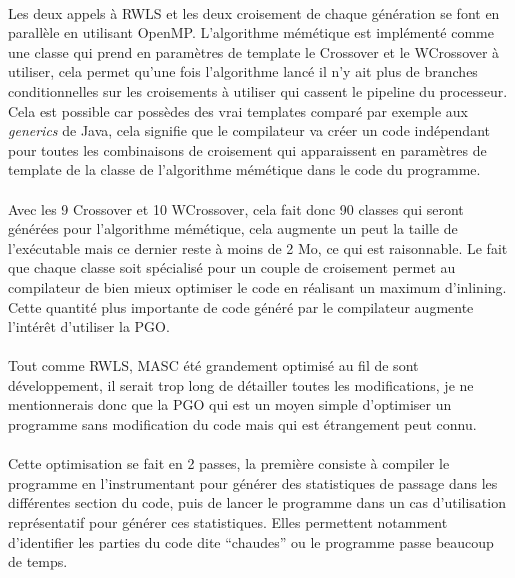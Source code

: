 \documentclass[a4paper,11pt,twoside,french,report]{../common/simplem}
\begin{document}
				\paragraph*{}
					Les deux appels à \gls{RWLS} et les deux croisement de chaque génération se font en parallèle en utilisant \gls{OpenMP}. L'algorithme mémétique est implémenté comme une classe qui prend en paramètres de template le Crossover et le WCrossover à utiliser, cela permet qu'une fois l'algorithme lancé il n'y ait plus de branches conditionnelles sur les croisements à utiliser qui cassent le pipeline du processeur. Cela est possible car \Cpp{} possèdes des vrai templates comparé par exemple aux \textit{generics} de Java, cela signifie que le compilateur va créer un code indépendant pour toutes les combinaisons de croisement qui apparaissent en paramètres de template de la classe de l'algorithme mémétique dans le code du programme.
				\paragraph*{}
					Avec les 9 Crossover et 10 WCrossover, cela fait donc 90 classes qui seront générées pour l'algorithme mémétique, cela augmente un peut la taille de l'exécutable mais ce dernier reste à moins de 2 Mo, ce qui est raisonnable. Le fait que chaque classe soit spécialisé pour un couple de croisement permet au compilateur de bien mieux optimiser le code en réalisant un maximum d'inlining. Cette quantité plus importante de code généré par le compilateur augmente l'intérêt d'utiliser la \gls{PGO}.
				\paragraph*{}
					Tout comme \gls{RWLS}, \gls{MASC} été grandement optimisé au fil de sont développement, il serait trop long de détailler toutes les modifications, je ne mentionnerais donc que la \gls{PGO} qui est un moyen simple d'optimiser un programme sans modification du code mais qui est étrangement peut connu.
				\paragraph*{}
					Cette optimisation se fait en 2 passes, la première consiste à compiler le programme en l'instrumentant pour générer des statistiques de passage dans les différentes section du code, puis de lancer le programme dans un cas d'utilisation représentatif pour générer ces statistiques. Elles permettent notamment d'identifier les parties du code dite ``chaudes'' ou le programme passe beaucoup de temps.
\end{document}
